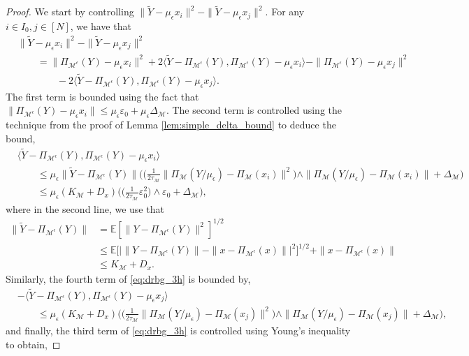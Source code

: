 \documentclass[10pt]{article}
\theoremstyle{plain}
\theoremstyle{definition}
\theoremstyle{remark}
\newcommand{\M}{{\mathcal{M}}}
\newcommand{\E}{\mathbb{E}}
\newcommand{\Pieps}{\Pi_{\M^\epsilon}}
\newcommand{\gap}{\Delta_\M}
\begin{document}
\begin{proof}
We start by controlling \(\|\tilde{Y} - \mu_\epsilon x_i\|^2-\|\tilde{Y} - \mu_\epsilon x_j\|^2\). For any \(i \in I_0, j \in [N]\), we have that
\begin{align}
    &\|\tilde{Y} - \mu_\epsilon x_i\|^2-\|\tilde{Y} - \mu_\epsilon x_j\|^2\nonumber\\
    & \qquad = \| \Pieps(Y) - \mu_\epsilon x_i\|^2  + 2 \langle \tilde{Y} - \Pieps(Y), \Pieps(Y) - \mu_\epsilon x_i \rangle - \|\Pieps(Y) - \mu_\epsilon x_j\|^2\nonumber\\
    & \qquad \qquad - 2 \langle \tilde{Y} - \Pieps(Y), \Pieps(Y) - \mu_\epsilon x_j \rangle.\label{eq:drbg_3h}
\end{align}
The first term is bounded using the fact that \(\|\Pieps(Y) - \mu_\epsilon x_i\| \leq \mu_\epsilon \varepsilon_0 + \mu_\epsilon \gap\). The second term is controlled using the technique from the proof of Lemma \ref{lem:simple_delta_bound} to deduce the bound,
\begin{align}
    &\langle \tilde{Y} - \Pieps(Y), \Pieps(Y) - \mu_\epsilon x_i \rangle\\
    & \qquad \leq \mu_\epsilon \|\tilde{Y} - \Pieps(Y)\| \Big ( \big ( \tfrac{1}{2\tau_\M} \|\Pi_\M(Y/\mu_\epsilon) - \Pi_\M(x_i)\|^2 \big ) \wedge \|\Pi_\M(Y/\mu_\epsilon) - \Pi_\M(x_i)\| + \gap \Big )\nonumber\\
    & \qquad \leq \mu_\epsilon (K_\M + D_x) \Big ( \big ( \tfrac{1}{2\tau_\M} \varepsilon_0^2 \big ) \wedge \varepsilon_0 + \gap \Big ),\label{eq:drbg_3hh}
\end{align}
where in the second line, we use that
\begin{align*}
    \|\tilde{Y} - \Pieps(Y)\| &= \E[\|Y - \Pieps(Y)\|^2]^{1/2} \\
    &\leq \E \Big [ \big | \|Y - \Pieps(Y)\| - \|x - \Pieps(x)\| \big |^2 \Big ]^{1/2} + \|x - \Pieps(x)\|\\
    &\leq K_\M + D_x.
\end{align*}
Similarly, the fourth term of \eqref{eq:drbg_3h} is bounded by,
\begin{align}
    &-\langle \tilde{Y} - \Pieps(Y), \Pieps(Y) - \mu_\epsilon x_j \rangle \nonumber\\
    & \qquad \leq \mu_\epsilon (K_\M + D_x) \Big ( \big ( \tfrac{1}{2\tau_\M} \|\Pi_\M(Y/\mu_\epsilon) - \Pi_\M(x_j)\|^2 \big ) \wedge \|\Pi_\M(Y/\mu_\epsilon) - \Pi_\M(x_j)\| + \gap \Big ),\label{eq:drbg_4h}
\end{align}
and finally, the third term of \eqref{eq:drbg_3h} is controlled using Young's inequality to obtain,

\end{proof}
\end{document}
